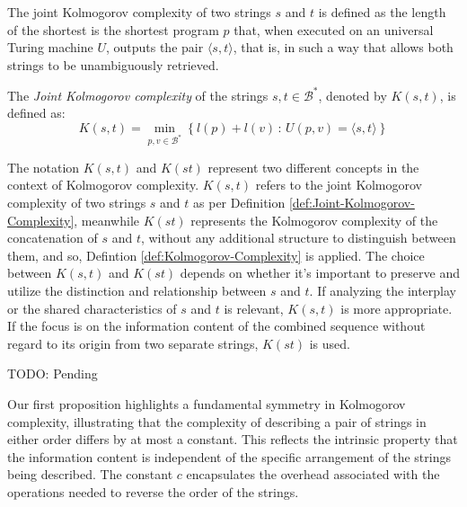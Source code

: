 The joint Kolmogorov complexity of two strings $s$ and $t$ is defined as the length of the shortest is the shortest program $p$ that, when executed on an universal Turing machine $U$, outputs the pair $\langle s, t \rangle$, that is, in such a way that allows both strings to be unambiguously retrieved.

\begin{definition}
\label{def:Joint-Kolmogorov-Complexity}
The \emph{Joint Kolmogorov complexity} of the strings $s, t \in \mathcal{B}^\ast$, denoted by $K(s, t)$, is defined as:
\[
K(s, t)=\min_{p,v \in \mathcal{B}^\ast}\left\{l(p) + l(v)\,:\, U(p,v)=\langle s, t \rangle \right\}
\]
\end{definition}

The notation $K(s, t)$ and $K(st)$ represent two different concepts in the context of Kolmogorov complexity. $K(s, t)$ refers to the joint Kolmogorov complexity of two strings $s$ and $t$ as per Definition \ref{def:Joint-Kolmogorov-Complexity}, meanwhile $K(st)$ represents the Kolmogorov complexity of the concatenation of $s$ and $t$, without any additional structure to distinguish between them, and so, Defintion \ref{def:Kolmogorov-Complexity} is applied. The choice between $K(s, t)$ and $K(st)$ depends on whether it's important to preserve and utilize the distinction and relationship between $s$ and $t$. If analyzing the interplay or the shared characteristics of $s$ and $t$ is relevant, $K(s, t)$ is more appropriate. If the focus is on the information content of the combined sequence without regard to its origin from two separate strings, $K(st)$ is used.

\begin{example}
{\color{red} TODO: Pending}
\end{example}

Our first proposition highlights a fundamental symmetry in Kolmogorov complexity, illustrating that the complexity of describing a pair of strings in either order differs by at most a constant. This reflects the intrinsic property that the information content is independent of the specific arrangement of the strings being described. The constant \(c\) encapsulates the overhead associated with the operations needed to reverse the order of the strings.

